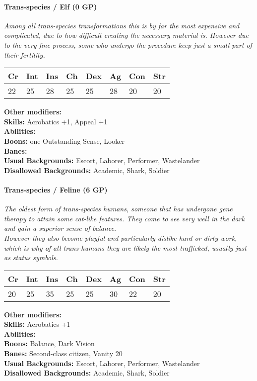 \documentclass[12pt,a4paper,openany]{book}
\begin{document}
	\hrulefill
	\paragraph*{Trans-species / Elf (0 GP)}
	\textit{Among all trans-species transformations this is by far the most expensive and complicated, due to how difficult creating the necessary material is. However due to the very fine process, some who undergo the procedure keep just a small part of their fertility.}\par
	\begin{tabular}{|l|l|l|l|l|l|l|l|}
		\hline
		Cr & Int & Ins & Ch & Dex & Ag & Con & Str \\ \hline
		22 & 25 & 28 & 25 & 25 & 28 & 20 & 20 \\ \hline
	\end{tabular}\par
	\noindent\textbf{Other modifiers:} \\
	\textbf{Skills:} Acrobatics +1, Appeal +1\\
	\textbf{Abilities:} \\
	\textbf{Boons:} one Outstanding Sense, Looker\\
	\textbf{Banes:} \\
	\textbf{Usual Backgrounds:} Escort, Laborer, Performer, Wastelander\\
	\textbf{Disallowed Backgrounds:} Academic, Shark, Soldier
	
	\hrulefill
	\paragraph*{Trans-species / Feline (6 GP)}
	\textit{The oldest form of trans-species humans, someone that has undergone gene therapy to attain some cat-like features. They come to see very well in the dark and gain a superior sense of balance.\\
	However they also become playful and particularly dislike hard or dirty work, which is why of all trans-humans they are likely the most trafficked, usually just as status symbols.}\par
	\begin{tabular}{|l|l|l|l|l|l|l|l|}
		\hline
		Cr & Int & Ins & Ch & Dex & Ag & Con & Str \\ \hline
		20 & 25 & 35 & 25 & 25 & 30 & 22 & 20 \\ \hline
	\end{tabular}\par
	\noindent\textbf{Other modifiers:} \\
	\textbf{Skills:} Acrobatics +1\\
	\textbf{Abilities:} \\
	\textbf{Boons:} Balance, Dark Vision\\
	\textbf{Banes:} Second-class citizen, Vanity 20\\
	\textbf{Usual Backgrounds:} Escort, Laborer, Performer, Wastelander\\
	\textbf{Disallowed Backgrounds:} Academic, Shark, Soldier
	
\end{document}
